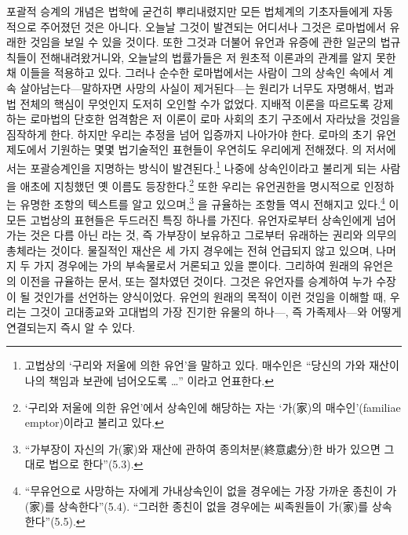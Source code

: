 포괄적 승계의 개념은 법학에 굳건히 뿌리내렸지만
모든 법체계의 기초자들에게 자동적으로 주어졌던 것은 아니다.
오늘날 그것이 발견되는 어디서나 그것은 로마법에서 유래한 것임을
보일 수 있을 것이다.
또한 그것과 더불어 유언과 유증에 관한 일군의 법규칙들이 전해내려왔거니와,
오늘날의 법률가들은 저 원초적 이론과의 관계를 알지 못한 채 이들을 적용하고 있다.
그러나 순수한 로마법에서는 사람이 그의 상속인 속에서
계속 살아남는다---말하자면 사망의 사실이 제거된다---는
원리가 너무도 자명해서, 법과 법 전체의 핵심이
무엇인지 도저히 오인할 수가 없었다.
지배적 이론을 따르도록 강제하는 로마법의 단호한 엄격함은
저 이론이 로마 사회의 초기 구조에서 자라났을 것임을 짐작하게 한다.
하지만 우리는 추정을 넘어 입증까지 나아가야 한다.
로마의 초기 유언 제도에서 기원하는
몇몇 법기술적인 표현들이 우연히도 우리에게 전해졌다.
의 저서에서는 포괄승계인을 지명하는 방식이
발견된다.\footnote{%
  고법상의 `구리와 저울에 의한 유언'을 말하고 있다.
  매수인은 ``당신의 가와 재산이 나의 책임과 보관에 넘어오도록 \ldots''
  이라고 언표한다. }
나중에 상속인이라고 불리게 되는 사람을 애초에 지칭했던 옛 이름도
등장한다.\footnote{%
  `구리와 저울에 의한 유언'에서
  상속인에 해당하는 자는 `가(家)의 매수인'(familiae emptor)이라고
  불리고 있다. }
또한 우리는 유언권한을 명시적으로 인정하는
유명한  조항의 텍스트를 알고 있으며,\footnote{%
  ``가부장이 자신의 가(家)와 재산에 관하여 종의처분(終意處分)한 바가 있으면
  그대로 법으로 한다''(5.3). }
을 규율하는 조항들 역시 전해지고 있다.\footnote{``무유언으로
  사망하는 자에게 가내상속인이 없을 경우에는 가장 가까운 종친이
  가(家)를 상속한다''(5.4).
  ``그러한 종친이 없을 경우에는 씨족원들이 가(家)를 상속한다''(5.5). }
이 모든 고법상의 표현들은 두드러진 특징 하나를 가진다.
유언자로부터 상속인에게 넘어가는 것은 다름 아닌 라는 것,
즉 가부장이 보유하고 그로부터 유래하는 권리와 의무의 총체라는 것이다.
물질적인 재산은 세 가지 경우에는 전혀 언급되지 않고 있으며,
나머지 두 가지 경우에는 가의 부속물로서 거론되고 있을 뿐이다.
그리하여 원래의 유언은 의 이전을 규율하는 문서,
또는  절차였던 것이다.
그것은 유언자를 승계하여 누가 수장이 될 것인가를 선언하는
양식이었다.
유언의 원래의 목적이 이런 것임을 이해할 때,
우리는 그것이 고대종교와 고대법의 가장 진기한 유물의
하나---, 즉 가족제사---와
어떻게 연결되는지 즉시 알 수 있다.
